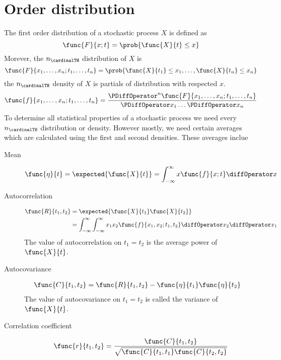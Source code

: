 \section{Order distribution}
The first order distribution of a stochastic process \(X\) is defined as 
\begin{equation*}
    \func{F}{x;t} = \prob{\func{X}{t} \leq x}
\end{equation*}
Morever, the \(n_{\cardinalTH}\) distribution of \(X\) is 
\begin{equation*}
    \func{F}{x_1 , \dots , x_n ; t_1 , \dots , t_n} = \prob{\func{X}{t_1} \leq x_1 , \dots , \func{X}{t_n} \leq x_n }
\end{equation*}
the \(n_{\cardinalTH}\) density of \(X\) is partials of distribution with respected \(x\).
\begin{equation*}
    \func{f}{x_1 , \dots , x_n ; t_1 , \dots , t_n} = \dfrac{\PDiffOperator^n \func{F}{x_1 , \dots , x_n ; t_1 , \dots , t_n}}{\PDiffOperator x_1 \dots \PDiffOperator x_n}
\end{equation*}
To determine all statistical properties of a stochastic process we need every \(n_{\cardinalTH}\) distribution or density. However mostly, we need certain averages which are calculated using the first and second densities. These averages inclue 
\begin{description}
    \item[Mean]
    \begin{equation*}
        \func{\eta}{t} = \expected{\func{X}{t}} = \int_{-\infty}^{\infty} x \func{f}{x;t} \diffOperator x
    \end{equation*}
    \item[Autocorrelation]
    \begin{align*}
        \func{R}{t_1, t_2}  &= \expected{\func{X}{t_1} \func{X}{t_2}} \\
        &= \int_{-\infty}^{\infty} \int_{-\infty}^{\infty} x_1 x_2 \func{f}{x_1 , x_2;t_1 , t_2} \diffOperator x_2 \diffOperator x_1
    \end{align*}
    The value of autocorrelation on \(t_1 = t_2\) is the average power of \(\func{X}{t}\).
    \item[Autocovariance]   
    \begin{align*}
        \func{C}{t_1, t_2}  &= \func{R}{t_1, t_2} - \func{\eta}{t_1} \func{\eta}{t_2}
    \end{align*}
    The value of autocovariance on \(t_1 = t_2\) is called the variance of \(\func{X}{t}\).
    \item [Correlation coefficient] 
    \begin{equation*}
        \func{r}{t_1,t_2} = \dfrac{\func{C}{t_1, t_2}}{\sqrt{\func{C}{t_1,t_1} \func{C}{t_2,t_2}}}
    \end{equation*}
\end{description}

